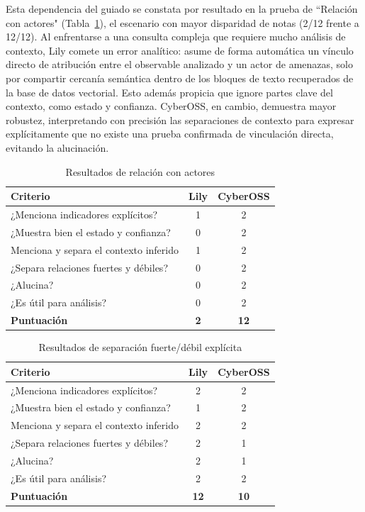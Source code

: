 \documentclass[12pt]{report}
\begin{document}
Esta dependencia del guiado se constata por resultado en la prueba de ``Relación con actores" (Tabla~\ref{tab:actores}), el escenario con mayor disparidad de notas (2/12 frente a 12/12). Al enfrentarse a una consulta compleja que requiere mucho análisis de contexto, Lily comete un error analítico: asume de forma automática un vínculo directo de atribución entre el observable analizado y un actor de amenazas, solo por compartir cercanía semántica dentro de los bloques de texto recuperados de la base de datos vectorial. Esto además propicia que ignore partes clave del contexto, como estado y confianza. CyberOSS, en cambio, demuestra mayor robustez, interpretando con precisión las separaciones de contexto para expresar explícitamente que no existe una prueba confirmada de vinculación directa, evitando la alucinación.

\begin{table}[H]
	\centering
	\small
	\begin{tabular}{ l c c }
		\toprule
		\textbf{Criterio} & \textbf{Lily} & \textbf{CyberOSS}  \\
		\midrule
		¿Menciona indicadores explícitos? & 1 & 2 \\
		¿Muestra bien el estado y confianza? & 0 & 2 \\
		Menciona y separa el contexto inferido & 1 & 2 \\
		¿Separa relaciones fuertes y débiles?  & 0 & 2 \\
		¿Alucina? & 0 & 2 \\
		¿Es útil para análisis? & 0 & 2 \\
		\midrule
		\textbf{Puntuación} & \textbf{2} & \textbf{12} \\
		\bottomrule
	\end{tabular}
	\caption{Resultados de relación con actores}
	\label{tab:actores}
\end{table}

\begin{table}[H]
	\centering
	\small
	\begin{tabular}{ l c c }
		\toprule
		\textbf{Criterio} & \textbf{Lily} & \textbf{CyberOSS}  \\
		\midrule
		¿Menciona indicadores explícitos? & 2 & 2 \\
		¿Muestra bien el estado y confianza? & 1 & 2 \\
		Menciona y separa el contexto inferido & 2 & 2 \\
		¿Separa relaciones fuertes y débiles?  & 2 & 1 \\
		¿Alucina? & 2 & 1 \\
		¿Es útil para análisis? & 2 & 2 \\
		\midrule
		\textbf{Puntuación} & \textbf{12} & \textbf{10} \\
		\bottomrule
	\end{tabular}
	\caption{Resultados de separación fuerte/débil explícita}
	\label{tab:fuerte_debil}
\end{table}
\end{document}
